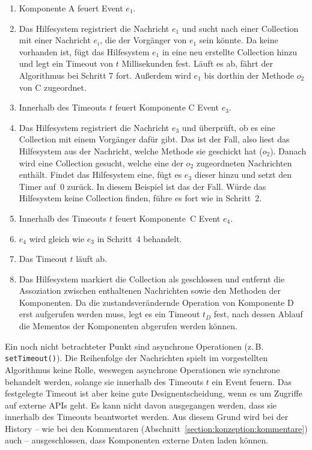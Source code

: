 \documentclass[
	headsepline,
	footsepline,
	fontsize=12pt,
	bibliography=totoc
]{scrbook}
\begin{document}
\begin{enumerate}
	\item Komponente A feuert Event $e_1$.
	\item Das Hilfesystem registriert die Nachricht $e_1$ und sucht nach einer Collection mit einer Nachricht $e_i$, die der Vorgänger von $e_1 $ sein könnte. Da keine vorhanden ist, fügt das Hilfesystem $e_1$ in eine neu erstellte Collection hinzu und legt ein Timeout von $t$ Millisekunden fest. Läuft es ab, fährt der Algorithmus bei Schritt 7 fort. Außerdem wird $e_1$ bis dorthin der Methode $o_2$ von C zugeordnet.
	\item Innerhalb des Timeouts $t$ feuert Komponente C Event $e_3$.
	\item Das Hilfesystem registriert die Nachricht $e_3$ und überprüft, ob es eine Collection mit einem Vorgänger dafür gibt. Das ist der Fall, also liest das Hilfesystem aus der Nachricht, welche Methode sie geschickt hat ($o_2$). Danach wird eine Collection gesucht, welche eine der $o_2$ zugeordneten Nachrichten enthält. Findet das Hilfesystem eine, fügt es $e_3$ dieser hinzu und setzt den Timer auf~0 zurück. In diesem Beispiel ist das der Fall. Würde das Hilfesystem keine Collection finden, führe es fort wie in Schritt~2.
	\item Innerhalb des Timeouts $t$ feuert Komponente~C Event $e_4$.
	\item $e_4$ wird gleich wie $e_3$ in Schritt~4 behandelt.
	\item Das Timeout $t$ läuft ab.
	\item Das Hilfesystem markiert die Collection als geschlossen und entfernt die Assoziation zwischen enthaltenen Nachrichten sowie den Methoden der Komponenten. Da die zustandsverändernde Operation von Komponente D erst aufgerufen werden muss, legt es ein Timeout $t_D$ fest, nach dessen Ablauf die Mementos der Komponenten abgerufen werden können.
\end{enumerate}


Ein noch nicht betrachteter Punkt sind asynchrone Operationen (z.\,B. \texttt{setTimeout()}). Die Reihenfolge der Nachrichten spielt im vorgestellten Algorithmus keine Rolle, weswegen asynchrone Operationen wie synchrone behandelt werden, solange sie innerhalb des Timeouts $t$ ein Event feuern. Das festgelegte Timeout ist aber keine gute Designentscheidung, wenn es um Zugriffe auf externe APIs geht. Es kann nicht davon ausgegangen werden, dass sie innerhalb des Timeouts beantwortet werden. Aus diesem Grund wird bei der History -- wie bei den Kommentaren (Abschnitt~\ref{section:konzeption:kommentare}) auch -- ausgeschlossen, dass Komponenten externe Daten laden können.
\end{document}
